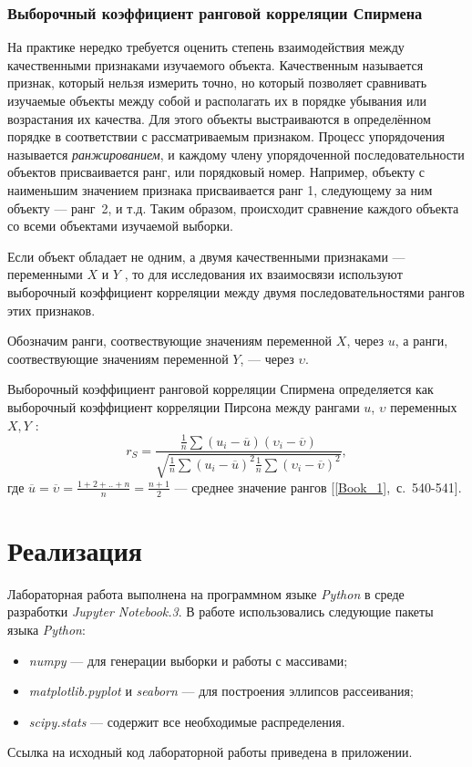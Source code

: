 \documentclass[12pt,a4paper]{article}
\begin{document}
	\subsubsection{Выборочный коэффициент ранговой корреляции Спирмена}
	На практике нередко требуется оценить степень взаимодействия между качественными признаками изучаемого объекта. Качественным называется признак, который нельзя измерить точно, но который позволяет сравнивать изучаемые объекты между собой и располагать их в порядке убывания или возрастания их качества. Для этого объекты выстраиваются в определённом порядке в соответствии с рассматриваемым признаком. Процесс упорядочения называется \emph{ранжированием}, и каждому члену упорядоченной последовательности объектов присваивается ранг, или порядковый номер. Например, объекту с наименьшим значением признака присваивается ранг 1, следующему за ним объекту --- ранг~2, и т.д. Таким образом, происходит сравнение каждого объекта со всеми объектами изучаемой выборки.
	
	Если объект обладает не одним, а двумя качественными признаками --- переменными $X$ и $Y$ , то для исследования их взаимосвязи используют выборочный коэффициент корреляции между двумя последовательностями рангов этих признаков.
	
	Обозначим ранги, соотвествующие значениям переменной $X$, через $u$, а ранги, соотвествующие значениям переменной $Y$, --- через $\upsilon$.
	
	Выборочный коэффициент ранговой корреляции Спирмена определяется как выборочный коэффициент корреляции Пирсона между рангами $u$, $\upsilon$ переменных $X, Y$ :
	\begin{equation}\label{eqn:sperman}
	r_S = \frac{\frac{1}{n} \sum(u_i - \overline{u})(\upsilon_i - \overline{\upsilon})}{\sqrt{\frac{1}{n} \sum (u_i - \overline{u})^2 \frac{1}{n} \sum(\upsilon_i - \overline{\upsilon})^2}},
	\end{equation}
	где $\overline{u} = \overline{\upsilon} = \frac{1 + 2 + .. + n}{n} = \frac{n + 1}{2}$ --- среднее значение рангов [\ref{Book_1},~с.~540-541].
	
	\section{Реализация}
	Лабораторная работа выполнена на программном языке \emph{Python} в среде разработки \emph{Jupyter Notebook.3}. В работе использовались следующие пакеты языка \emph{Python}:
	\begin{itemize}
		\item \emph{numpy} --- для генерации выборки и работы с массивами;
		
		\item \emph{matplotlib.pyplot} и \emph{seaborn} --- для построения эллипсов рассеивания;
		
		\item \emph{scipy.stats} --- содержит все необходимые распределения.
	\end{itemize}
	Ссылка на исходный код лабораторной работы приведена в приложении.
	
\end{document}
